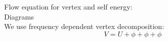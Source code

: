 Flow equation for vertex and self energy:
\\
Diagrams
\\

We use frequency dependent vertex decomposition:
\begin{equation}
V = U + \phi + \phi + \phi
\end{equation}
